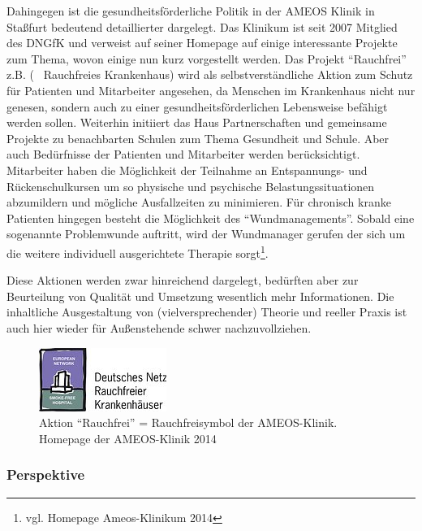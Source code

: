 Dahingegen ist die gesundheitsförderliche Politik in der AMEOS Klinik in Staßfurt bedeutend detaillierter dargelegt. Das Klinikum ist seit 2007 Mitglied des DNGfK und verweist auf seiner Homepage auf einige interessante Projekte zum Thema, wovon einige nun kurz vorgestellt werden. Das Projekt "`Rauchfrei"' z.B. (~ Rauchfreies Krankenhaus) wird als selbstverständliche Aktion zum Schutz für Patienten und Mitarbeiter angesehen, da Menschen im Krankenhaus nicht nur genesen, sondern auch zu einer gesundheitsförderlichen Lebensweise befähigt werden sollen. Weiterhin initiiert das Haus Partnerschaften und gemeinsame Projekte zu benachbarten Schulen zum Thema Gesundheit und Schule. Aber auch Bedürfnisse der Patienten und Mitarbeiter werden berücksichtigt. Mitarbeiter haben die Möglichkeit der Teilnahme an Entspannungs- und Rückenschulkursen um so physische und psychische Belastungssituationen abzumildern und mögliche Ausfallzeiten zu minimieren. Für chronisch kranke Patienten hingegen besteht die Möglichkeit des "`Wundmanagements"'. Sobald eine sogenannte Problemwunde auftritt, wird der Wundmanager gerufen der sich um die weitere individuell ausgerichtete Therapie sorgt\footnote{vgl. Homepage Ameos-Klinikum 2014}.

Diese Aktionen werden zwar hinreichend dargelegt, bedürften aber zur Beurteilung von Qualität und Umsetzung wesentlich mehr Informationen. Die inhaltliche Ausgestaltung von (vielversprechender) Theorie und reeller Praxis ist auch hier wieder für Außenstehende schwer nachzuvollziehen.

\begin{figure}[h]
	\centering
		\includegraphics[scale=2.75]{rauchfreiymbol.jpg}
	\caption{Aktion "`Rauchfrei"' = Rauchfreisymbol der AMEOS-Klinik. Homepage der AMEOS-Klinik 2014}
	\label{fig:rauchfreiymbol}
\end{figure}

\subsubsection{Perspektive}
\label{sec:Perspektive}

